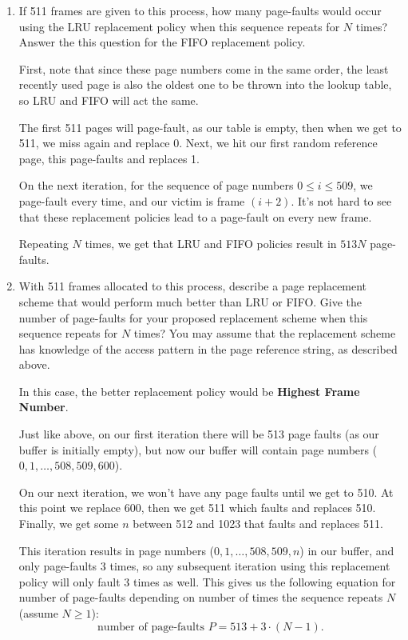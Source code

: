 \documentclass[11pt]{article}
\newcommand{\n}{\vspace{0.3cm}}
\begin{document}
\begin{enumerate}
    \begin{enumerate}
      \item If 511 frames are given to this process, how many page-faults would occur using the LRU replacement policy when this sequence repeats for \(N\) times?  Answer the this question for the FIFO replacement policy. \n

        First, note that since these page numbers come in the same order, the least recently used page is also the oldest one to be thrown into the lookup table, so LRU and FIFO will act the same. \n

        The first 511 pages will page-fault, as our table is empty, then when we get to 511, we miss again and replace 0.  Next, we hit our first random reference page, this page-faults and replaces 1. \n

        On the next iteration, for the sequence of page numbers \(0 \leq i \leq 509\), we page-fault every time, and our victim is frame \((i+2)\).  It's not hard to see that these replacement policies lead to a page-fault on every new frame. \n

        Repeating \(N\) times, we get that LRU and FIFO policies result in \(513N\) page-faults. \n

      \item With 511 frames allocated to this process, describe a page replacement scheme that would perform much better than LRU or FIFO.  Give the number of page-faults for your proposed replacement scheme when this sequence repeats for \(N\) times?  You may assume that the replacement scheme has knowledge of the access pattern in the page reference string, as described above. \n

        In this case, the better replacement policy would be \textbf{Highest Frame Number}. \n

        Just like above, on our first iteration there will be 513 page faults (as our buffer is initially empty), but now our buffer will contain page numbers (\(0,1,\hdots,508,509,600\)). \n

        On our next iteration, we won't have any page faults until we get to 510.  At this point we replace 600, then we get 511 which faults and replaces 510.  Finally, we get some \(n\) between 512 and 1023 that faults and replaces 511. \n

        This iteration results in page numbers (\(0,1,\hdots,508,509,n\)) in our buffer, and only page-faults 3 times, so any subsequent iteration using this replacement policy will only fault 3 times as well.  This gives us the following equation for number of page-faults depending on number of times the sequence repeats \(N\) (assume \(N \geq 1\)):
        \[\text{number of page-faults } P = 513 + 3 \cdot (N-1).\]


\end{enumerate}
\end{enumerate}
\end{document}
